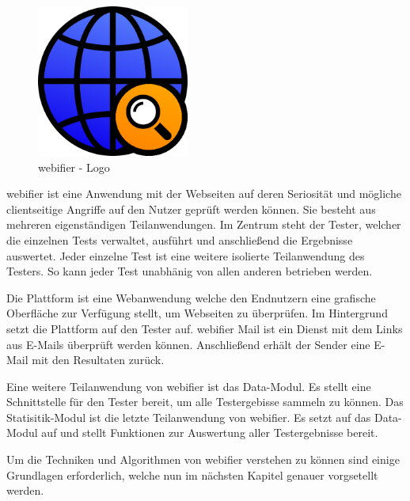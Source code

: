 \begin{figure}[H]
  \centering
  \includegraphics[width=5cm]{images/webifier}
  \caption{webifier - Logo}
  \label{fig:webifier-logo}
\end{figure}

webifier ist eine Anwendung mit der Webseiten auf deren Seriosität und mögliche clientseitige Angriffe auf den Nutzer geprüft werden können. Sie besteht aus mehreren eigenständigen Teilanwendungen. Im Zentrum steht der Tester, welcher die einzelnen Tests verwaltet, ausführt und anschließend die Ergebnisse auswertet. Jeder einzelne Test ist eine weitere isolierte Teilanwendung des Testers. So kann jeder Test unabhänig von allen anderen betrieben werden.

Die Plattform ist eine Webanwendung welche den Endnutzern eine grafische Oberfläche zur Verfügung stellt, um Webseiten zu überprüfen. Im Hintergrund setzt die Plattform auf den Tester auf. webifier Mail ist ein Dienst mit dem Links aus E-Mails überprüft werden können. Anschließend erhält der Sender eine E-Mail mit den Resultaten zurück.

Eine weitere Teilanwendung von webifier ist das Data-Modul. Es stellt eine Schnittstelle für den Tester bereit, um alle Testergebisse sammeln zu können. Das Statisitik-Modul ist die letzte Teilanwendung von webifier. Es setzt auf das Data-Modul auf und stellt Funktionen zur Auswertung aller Testergebnisse bereit.

Um die Techniken und Algorithmen von webifier verstehen zu können sind einige Grundlagen erforderlich, welche nun im nächsten Kapitel genauer vorgsetellt werden.

